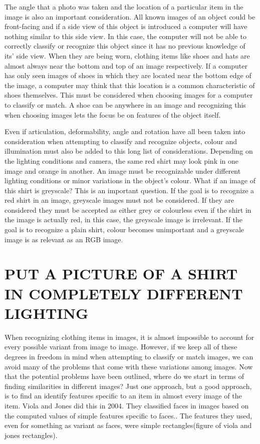 \documentclass[12pt]{article} %
\begin{document}
	The angle that a photo was taken and the location of a particular item in the image is also an important consideration. All known images of an object could be front-facing and if a side view of this object is introduced a computer will have nothing similar to this side view. In this case, the computer will not be able to correctly classify or recognize this object since it has no previous knowledge of its' side view. When they are being worn, clothing items like shoes and hats are almost always near the bottom and top of an image respectively. If a computer has only seen images of shoes in which they are located near the bottom edge of the image, a computer may think that this location is a common characteristic of shoes themselves. This must be considered when choosing images for a computer to classify or match. A shoe can be anywhere in an image and recognizing this when choosing images lets the focus be on features of the object itself. 
	
	Even if articulation, deformability, angle and rotation have all been taken into consideration when attempting to classify and recognize objects, colour and illumination must also be added to this long list of considerations. Depending on the lighting conditions and camera, the same red shirt may look pink in one image and orange in another. An image must be recognizable under different lighting conditions or minor variations in the object's colour. What if an image of this shirt is greyscale? This is an important question. If the goal is to recognize a red shirt in an image, greyscale images must not be considered. If they are considered they must be accepted as either grey or colourless even if the shirt in the image is actually red, in this case, the greyscale image is irrelevant. If the goal is to recognize a plain shirt, colour becomes unimportant and a greyscale image is as relevant as an RGB image.
	
 \section{PUT A PICTURE OF A SHIRT IN COMPLETELY DIFFERENT LIGHTING}
	
	When recognizing clothing items in images, it is almost impossible to account for every possible variant from image to image. However, if we keep all of these degrees in freedom in mind when attempting to classify or match images, we can avoid many of the problems that come with these variations among images. Now that the potential problems have been outlined, where do we start in terms of finding similarities in different images? Just one approach, but a good approach, is to find an identify features specific to an item in almost every image of the item. Viola and Jones did this in 2004. They classified faces in images based on the computed values of simple features specific to faces.\cite{viola2004robust}. The features they used, even for something as variant as faces, were simple rectangles(figure of viola and jones rectangles). 
	
\end{document}
